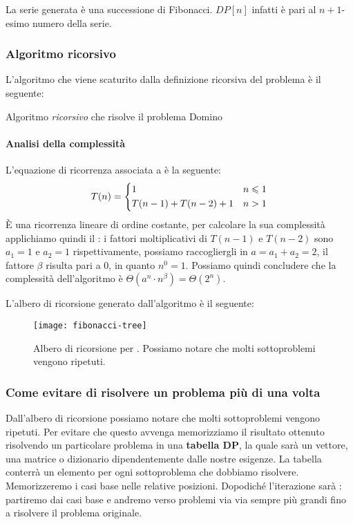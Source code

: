La serie generata è una successione di Fibonacci.
\(DP[n]\) infatti è pari al \(n + 1\)-esimo numero della serie.

\subsubsection{Algoritmo ricorsivo}

L'algoritmo che viene scaturito dalla definizione ricorsiva del problema è il seguente:

\begin{algorithm}[H]
    \caption{Algoritmo \emph{ricorsivo} che risolve il problema Domino}
    
\end{algorithm}

\paragraph{Analisi della complessità}
L'equazione di ricorrenza associata a \fibonacciRic è la seguente:
\[
    T(n) =
    \begin{dcases}
    1                   & n \leqslant 1 \\
    T(n-1) + T(n-2) + 1 & n > 1 \\
    \end{dcases}
\]
\`{E} una ricorrenza lineare di ordine costante, per calcolare la sua complessità applichiamo quindi il : i fattori moltiplicativi di \(T(n-1)\) e \(T(n-2)\) sono \(a_1 = 1\) e \(a_2 = 1\) rispettivamente, possiamo raccogliergli in \(a = a_1 + a_2 = 2\), il fattore \(\beta\) risulta pari a \(0\), in quanto \(n^0=1\).
Possiamo quindi concludere che la complessità dell'algoritmo è \(\Theta(a^n \cdot n^\beta) = \Theta(2^n)\).

L'albero di ricorsione generato dall'algoritmo è il seguente:

\begin{figure}[H]\centering
    \texttt{[image: fibonacci-tree]}
    \caption[]{Albero di ricorsione per \fibonacciRic. Possiamo notare che molti sottoproblemi vengono ripetuti.}
\end{figure}

\subsubsection{Come evitare di risolvere un problema più di una volta}

Dall'albero di ricorsione possiamo notare che molti sottoproblemi vengono ripetuti.
Per evitare che questo avvenga memorizziamo il risultato ottenuto risolvendo un particolare
problema in una \textbf{tabella DP}, la quale sarà un vettore, una matrice o dizionario dipendentemente dalle nostre esigenze.
La tabella conterrà un elemento per ogni sottoproblema che dobbiamo risolvere.
Memorizzeremo i casi base nelle relative posizioni.
Dopodiché l'iterazione sarà : partiremo dai casi base e andremo verso problemi via via sempre più grandi fino a risolvere il problema originale.

